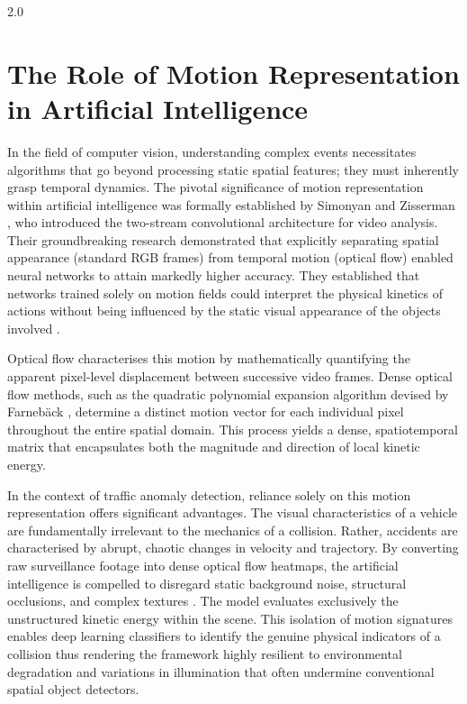 \begin{spacing}{2.0}
\section{The Role of Motion Representation in Artificial Intelligence}
In the field of computer vision, understanding complex events necessitates algorithms that go beyond processing static spatial features; they must inherently grasp temporal dynamics. The pivotal significance of motion representation within artificial intelligence was formally established by Simonyan and Zisserman \cite{simonyan_two-stream_2014}, who introduced the two-stream convolutional architecture for video analysis. Their groundbreaking research demonstrated that explicitly separating spatial appearance (standard RGB frames) from temporal motion (optical flow) enabled neural networks to attain markedly higher accuracy. They established that networks trained solely on motion fields could interpret the physical kinetics of actions without being influenced by the static visual appearance of the objects involved \cite{simonyan_two-stream_2014}.

Optical flow characterises this motion by mathematically quantifying the apparent pixel-level displacement between successive video frames. Dense optical flow methods, such as the quadratic polynomial expansion algorithm devised by Farnebäck \cite{goos_two-frame_2003}, determine a distinct motion vector for each individual pixel throughout the entire spatial domain. This process yields a dense, spatiotemporal matrix that encapsulates both the magnitude and direction of local kinetic energy.

In the context of traffic anomaly detection, reliance solely on this motion representation offers significant advantages. The visual characteristics of a vehicle are fundamentally irrelevant to the mechanics of a collision. Rather, accidents are characterised by abrupt, chaotic changes in velocity and trajectory. By converting raw surveillance footage into dense optical flow heatmaps, the artificial intelligence is compelled to disregard static background noise, structural occlusions, and complex textures \cite{nawaratne_spatiotemporal_2020}. The model evaluates exclusively the unstructured kinetic energy within the scene. This isolation of motion signatures enables deep learning classifiers to identify the genuine physical indicators of a collision thus rendering the framework highly resilient to environmental degradation and variations in illumination that often undermine conventional spatial object detectors.


\end{spacing}
